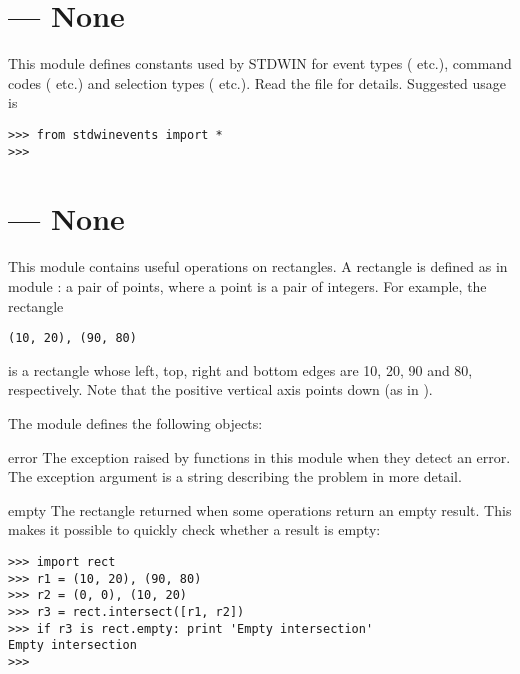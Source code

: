 \section{ ---
         None}



This module defines constants used by STDWIN for event types
( etc.), command codes ( etc.)
and selection types ( etc.).
Read the file for details.
Suggested usage is

\begin{verbatim}
>>> from stdwinevents import *
>>> 
\end{verbatim}
%
\section{ ---
         None}



This module contains useful operations on rectangles.
A rectangle is defined as in module
:
a pair of points, where a point is a pair of integers.
For example, the rectangle

\begin{verbatim}
(10, 20), (90, 80)
\end{verbatim}
%
is a rectangle whose left, top, right and bottom edges are 10, 20, 90
and 80, respectively.
Note that the positive vertical axis points down (as in
).

The module defines the following objects:

\begin{excdesc}{error}
The exception raised by functions in this module when they detect an
error.
The exception argument is a string describing the problem in more
detail.
\end{excdesc}

\begin{datadesc}{empty}
The rectangle returned when some operations return an empty result.
This makes it possible to quickly check whether a result is empty:

\begin{verbatim}
>>> import rect
>>> r1 = (10, 20), (90, 80)
>>> r2 = (0, 0), (10, 20)
>>> r3 = rect.intersect([r1, r2])
>>> if r3 is rect.empty: print 'Empty intersection'
Empty intersection
>>> 
\end{verbatim}
\end{datadesc}

